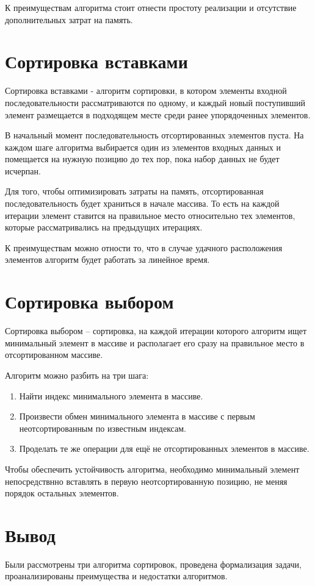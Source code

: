 К преимуществам алгоритма стоит отнести простоту реализации и отсутствие дополнительных затрат на память.

\section{Сортировка вставками}
Сортировка вставками - алгоритм сортировки, в котором элементы входной последовательности рассматриваются по одному, 
и каждый новый поступивший элемент размещается в подходящем месте среди ранее упорядоченных элементов\cite{insert}.

В начальный момент последовательность отсортированных элементов пуста. 
На каждом шаге алгоритма выбирается один из элементов входных данных и помещается на нужную позицию до тех пор,
пока набор данных не будет исчерпан.

Для того, чтобы оптимизировать затраты на память, отсортированная последовательность будет храниться в начале массива.
То есть на каждой итерации элемент ставится на правильное место относительно тех элементов, которые рассматривались 
на предыдущих итерациях.

К преимуществам можно отности то, что в случае удачного расположения элементов алгоритм будет работать за линейное время.

\section{Сортировка выбором}
Сортировка выбором -- сортировка, на каждой итерации которого алгоритм ищет минимальный элемент в массиве
и располагает его сразу на правильное место в отсортированном массиве. \cite{select}

Алгоритм можно разбить на три шага:
\begin{enumerate}
	\item Найти индекс минимального элемента в массиве.
	\item Произвести обмен минимального элемента в массиве с первым неотсортированным по известным индексам.
	\item Проделать те же операции для ещё не отсортированных элементов в массиве.
\end{enumerate}

Чтобы обеспечить устойчивость алгоритма, необходимо минимальный элемент непосредствнно вставлять в первую неотсортированную
позицию, не меняя порядок остальных элементов.

\section{Вывод}
Были рассмотрены три алгоритма сортировок, проведена формализация задачи,
проанализированы преимущества и недостатки алгоритмов.


